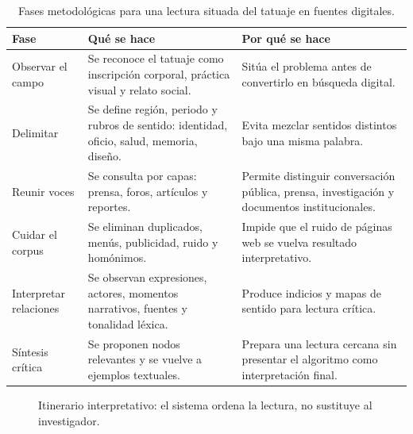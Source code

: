 \documentclass[11pt]{article}
\begin{document}
\begin{table}[H]
\centering
\small
\begin{tabular}{L{0.16\textwidth}L{0.36\textwidth}L{0.38\textwidth}}
\toprule
\textbf{Fase} & \textbf{Qué se hace} & \textbf{Por qué se hace} \\
\midrule
Observar el campo & Se reconoce el tatuaje como inscripción corporal, práctica visual y relato social. &
Sitúa el problema antes de convertirlo en búsqueda digital. \\
\addlinespace
Delimitar & Se define región, periodo y rubros de sentido: identidad, oficio, salud, memoria, diseño. &
Evita mezclar sentidos distintos bajo una misma palabra. \\
\addlinespace
Reunir voces & Se consulta por capas: prensa, foros, artículos y reportes. &
Permite distinguir conversación pública, prensa, investigación y documentos institucionales. \\
\addlinespace
Cuidar el corpus & Se eliminan duplicados, menús, publicidad, ruido y homónimos. &
Impide que el ruido de páginas web se vuelva resultado interpretativo. \\
\addlinespace
Interpretar relaciones & Se observan expresiones, actores, momentos narrativos, fuentes y tonalidad léxica. &
Produce indicios y mapas de sentido para lectura crítica. \\
\addlinespace
Síntesis crítica & Se proponen nodos relevantes y se vuelve a ejemplos textuales. &
Prepara una lectura cercana sin presentar el algoritmo como interpretación final. \\
\bottomrule
\end{tabular}
\caption{Fases metodológicas para una lectura situada del tatuaje en fuentes digitales.}
\label{tab:fases-es}
\end{table}

\begin{figure}[H]
\centering
{}
\caption{Itinerario interpretativo: el sistema ordena la lectura, no sustituye al investigador.}
\label{fig:fases-es}
\end{figure}
\end{document}
